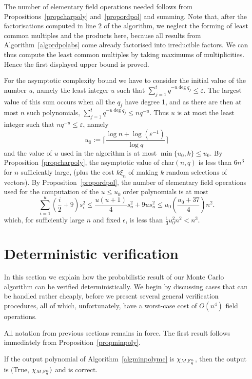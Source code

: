 The number of elementary field operations needed follows from 
Propositions~\ref{propcharpoly} and~\ref{propordpol} and summing. Note that,
after the factorisations computed in line 2 of the algorithm, we neglect
the forming of least common multiples and the products here, because
all results from Algorithm~\ref{algordpolabs} come already factorised
into irreducible factors. We can thus compute the least common multiples
by taking maximums of multiplicities. Hence the first displayed upper
bound is proved.

For the asymptotic complexity bound we have to consider the initial value of the number $u$,
namely the least integer $u$ such that $\sum_{j=1}^t q^{-u \deg q_j} \le \varepsilon$.
The largest value of this sum occurs when all the $q_j$ have degree 1, and as there are 
then at most $n$ such polynomials,  $\sum_{j=1}^t q^{-u \deg q_j}\le nq^{-u}$. 
Thus $u$ is at most the least integer such that $nq^{-u}\le \varepsilon$, namely 
\[
u_0:=\lceil \frac{\log n + \log (\varepsilon^{-1})}{\log q}\rceil
\]
and the value of $u$ used in the algorithm is at most $\min\{u_0,k\}\leq u_0$.
By Proposition~\ref{propcharpoly}, the asymptotic value of char$(n,q)$ is
less than $6n^3$ for $n$ sufficiently large, (plus the cost $k\xi_n$ 
of making $k$ random selections of vectors). 
By Proposition~\ref{propordpol},  the number of elementary
field operations used for the computation of the  $u\le u_0$ order polynomials
is at most
\[
\sum_{i=1}^u(\frac{i}{2}+9)s_i^2 \leq \frac{u(u+1)}{4}s_u^2+9us_u^2
\le u_0\left(\frac{u_0+37}{4}\right) n^2.
\]
which, for sufficiently large $n$ and fixed $\epsilon$, is less than
$\frac{1}{3}u_0^2n^2<n^3$.
\proofend

\section{Deterministic verification}
\label{verify}
%

In this section we explain how the probabilistic result of our Monte Carlo
algorithm can be verified deterministically. We begin by discussing cases
that can be handled rather cheaply, before we present several general verification procedures, all of which, unfortunately, have a worst-case cost of $O(n^4)$ field operations.

All notation from previous sections remains in force. The first result 
follows immediately from Proposition~\ref{propminpoly}.

\begin{Prop}
If the output polynomial of Algorithm~\ref{algminpolymc} is  $\chi_{M,\mathbb{F}_q^n}$,
then the output is $(${\sc True}, $\chi_{M,\mathbb{F}_q^n})$
and is correct.
\end{Prop}


